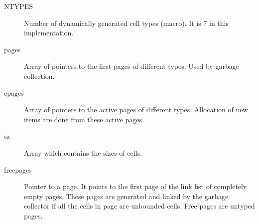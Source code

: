 \begin{description}
  \item[NTYPES] Number of dynamically generated cell types (macro).
      It is 7 in this implementation.
  \item[pages] Array of pointers to the first pages of different types.
               Used by garbage collection.
  \item[cpages] Array of pointers to the active pages of different types.
     Allocation of new items are done from these active pages.
  \item[sz] Array which contains the sizes of cells.
  \item[freepages] Pointer to a page. It points to the first page of the link
      list of completely empty pages. These pages are generated and linked by
      the garbage collector if all the cells in page are unbounded cells. Free
      pages are untyped pages.
\end{description}
\setlength{\unitlength}{1mm}
